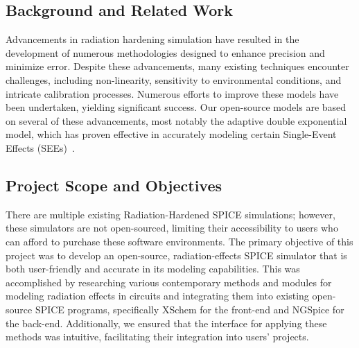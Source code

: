 \documentclass[conference]{IEEEtran}
\begin{document}
    \subsection{Background and Related Work}\label{subsec:background-and-related-work}
    Advancements in radiation hardening simulation have resulted in the development of numerous methodologies designed to enhance precision and minimize error.
    Despite these advancements, many existing techniques encounter challenges, including non-linearity, sensitivity to environmental conditions, and intricate calibration processes.
    Numerous efforts to improve these models have been undertaken, yielding significant success.
    Our open-source models are based on several of these advancements, most notably the adaptive double exponential model, which has proven effective in accurately modeling certain Single-Event Effects (SEEs)~\cite{}.

    \subsection{Project Scope and Objectives}\label{subsec:project-scope-and-objectives}
    There are multiple existing Radiation-Hardened SPICE simulations; however, these simulators are not open-sourced, limiting their accessibility to users who can afford to purchase these software environments.
    The primary objective of this project was to develop an open-source, radiation-effects SPICE simulator that is both user-friendly and accurate in its modeling capabilities.
    This was accomplished by researching various contemporary methods and modules for modeling radiation effects in circuits and integrating them into existing open-source SPICE programs, specifically XSchem for the front-end and NGSpice for the back-end.
    Additionally, we ensured that the interface for applying these methods was intuitive, facilitating their integration into users' projects.
\end{document}
